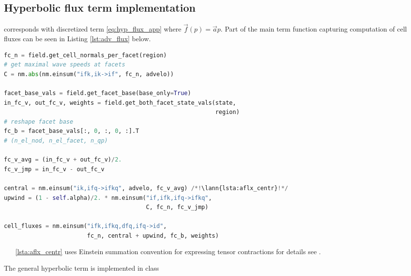 \subsection{Hyperbolic flux term implementation}
\label{se:adv_flux_term_imp}
 corresponds with discretized term \eqref{eq:hyp_flux_app} where 
$\vec{f}(p) = \vec{a}p$. Part of the main term function capturing computation of cell fluxes can be 
seen in Listing \ref{lst:adv_flux} below. 
\setcounter{lstannotation}{0}
\begin{lstlisting}[language=Python, caption=Computation of advection cell 
fluxes \label{lst:adv_flux}]
fc_n = field.get_cell_normals_per_facet(region)
# get maximal wave speeds at facets
C = nm.abs(nm.einsum("ifk,ik->if", fc_n, advelo))

facet_base_vals = field.get_facet_base(base_only=True)
in_fc_v, out_fc_v, weights = field.get_both_facet_state_vals(state,
                                                             region)
# reshape facet base
fc_b = facet_base_vals[:, 0, :, 0, :].T
# (n_el_nod, n_el_facet, n_qp)

fc_v_avg = (in_fc_v + out_fc_v)/2.
fc_v_jmp = in_fc_v - out_fc_v

central = nm.einsum("ik,ifq->ifkq", advelo, fc_v_avg) /*!\lann{lsta:aflx_centr}!*/
upwind = (1 - self.alpha)/2. * nm.einsum("if,ifk,ifq->ifkq",
                                         C, fc_n, fc_v_jmp)

cell_fluxes = nm.einsum("ifk,ifkq,dfq,ifq->id",
                        fc_n, central + upwind, fc_b, weights)
\end{lstlisting}
\begin{itemize}
    \item[\ref{lsta:aflx_centr}]  uses Einstein summation convention for 
    expressing tensor contractions for details see \cite{einsum-doc}.
\end{itemize}
The general hyperbolic term is implemented in class 



